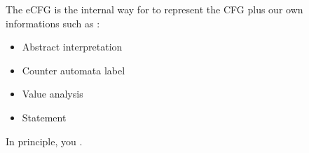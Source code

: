 The \gls{eCFG} is the internal way for \flatac to represent the  \gls{CFG} plus our own informations such as :
\begin{itemize}
	\item Abstract interpretation
	\item Counter automata label
	\item Value analysis
	\item Statement
\end{itemize}


In principle, you .
